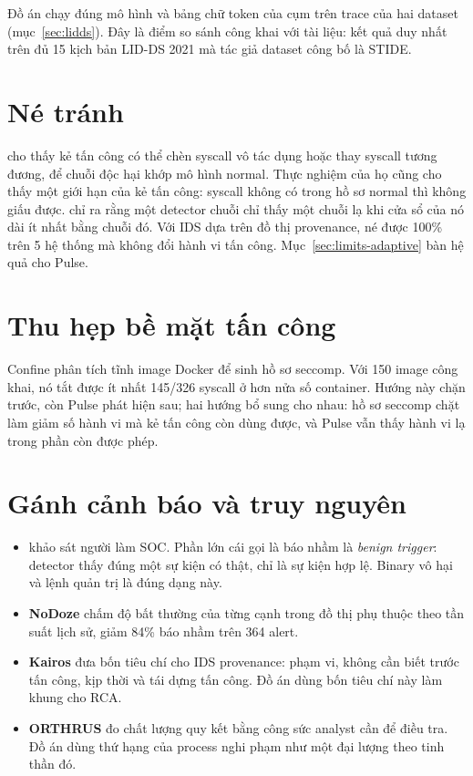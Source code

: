 Đồ án chạy đúng mô hình và bảng chữ token của cụm trên trace của hai dataset (mục~\ref{sec:lidds}). Đây là điểm so sánh công khai với tài liệu: kết quả duy nhất trên đủ 15 kịch bản LID-DS 2021 mà tác giả dataset công bố là STIDE.

\section{Né tránh}

\citet{wagner2002} cho thấy kẻ tấn công có thể chèn syscall vô tác dụng hoặc thay syscall tương đương, để chuỗi độc hại khớp mô hình normal. Thực nghiệm của họ cũng cho thấy một giới hạn của kẻ tấn công: syscall không có trong hồ sơ normal thì không giấu được. \citet{tan2002} chỉ ra rằng một detector chuỗi chỉ thấy một chuỗi lạ khi cửa sổ của nó dài ít nhất bằng chuỗi đó. Với IDS dựa trên đồ thị provenance, \citet{goyal2023} né được 100\% trên 5 hệ thống mà không đổi hành vi tấn công. Mục~\ref{sec:limits-adaptive} bàn hệ quả cho Pulse.

\section{Thu hẹp bề mặt tấn công}

Confine \citep{ghavamnia2020a} phân tích tĩnh image Docker để sinh hồ sơ seccomp. Với 150 image công khai, nó tắt được ít nhất 145/326 syscall ở hơn nửa số container. Hướng này chặn trước, còn Pulse phát hiện sau; hai hướng bổ sung cho nhau: hồ sơ seccomp chặt làm giảm số hành vi mà kẻ tấn công còn dùng được, và Pulse vẫn thấy hành vi lạ trong phần còn được phép.

\section{Gánh cảnh báo và truy nguyên}

\begin{itemize}
\tightlist
\item
  \textbf{\citet{alahmadi2022}} khảo sát người làm SOC. Phần lớn cái gọi là báo nhầm là \emph{benign trigger}: detector thấy đúng một sự kiện có thật, chỉ là sự kiện hợp lệ. Binary vô hại và lệnh quản trị là đúng dạng này.
\item
  \textbf{NoDoze} \citep{hassan2019} chấm độ bất thường của từng cạnh trong đồ thị phụ thuộc theo tần suất lịch sử, giảm 84\% báo nhầm trên 364 alert.
\item
  \textbf{Kairos} \citep{cheng2023} đưa bốn tiêu chí cho IDS provenance: phạm vi, không cần biết trước tấn công, kịp thời và tái dựng tấn công. Đồ án dùng bốn tiêu chí này làm khung cho RCA.
\item
  \textbf{ORTHRUS} \citep{jiang2025} đo chất lượng quy kết bằng công sức analyst cần để điều tra. Đồ án dùng thứ hạng của process nghi phạm như một đại lượng theo tinh thần đó.
\end{itemize}

